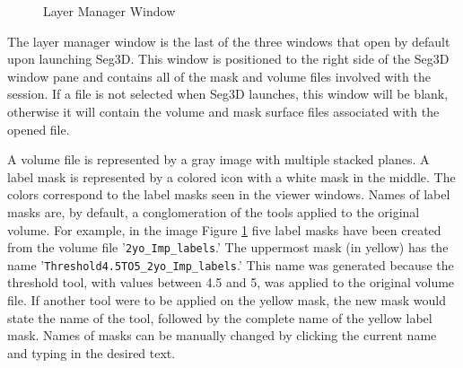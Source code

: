 \documentclass[fleqn,11pt,openany]{book}
\begin{document}
\begin{figure}[ht!]
\caption{Layer Manager Window}\label{fig:LayerWindow}
\end{figure}

The layer manager window is the last of the three windows that open by default upon launching Seg3D.  
This window is positioned to the right side of the Seg3D window pane and contains all of the mask and volume files involved with the session.  
If a file is not selected when Seg3D launches, this window will be blank, otherwise it will contain the volume and mask surface files associated with the opened file.

A volume file is represented by a gray image with multiple stacked planes.  
A label mask is represented by a colored icon with a white mask in the middle.  
The colors correspond to the label masks seen in the viewer windows.
Names of label masks are, by default, a conglomeration of the tools applied to the original volume.
For example, in the image Figure \ref{fig:LayerWindow} five label masks have been created from the volume file '\verb|2yo_Imp_labels|.' 
The uppermost mask (in yellow) has the name '\verb|Threshold4.5TO5_2yo_Imp_labels|.' 
This name was generated because the threshold tool, with values between 4.5 and 5, was applied to the original volume file. 
If another tool were to be applied on the yellow mask, the new mask would state the name of the tool, followed by the complete name of the yellow label mask.  
Names of masks can be manually changed by clicking the current name and typing in the desired text.
\end{document}
